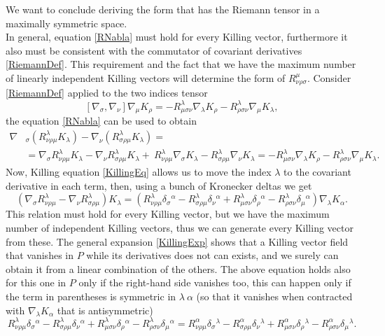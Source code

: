 We want to conclude deriving the form that has the Riemann tensor in a maximally symmetric space.\\
In general, equation \eqref{RNabla} must hold for every Killing vector, furthermore it also must be consistent with the commutator of covariant derivatives \eqref{RiemannDef}. This requirement and the fact that we have the maximum number of linearly independent Killing vectors will determine the form of $R^\mu_{\nu\rho\sigma}$. Consider \eqref{RiemannDef} applied to the two indices tensor $$ [\nabla_\sigma,\nabla_\nu]\nabla_\mu K_\rho=-R^\lambda_{\mu\sigma\nu}\nabla_\lambda K_\rho-R^\lambda _{\rho\sigma\nu}\nabla_\mu K_\lambda,$$ the equation \eqref{RNabla} can be used to obtain 
\begin{align*}
    \nabla&_\sigma(R^\lambda_{\nu\rho\mu}K_\lambda)-\nabla_\nu(R^\lambda_{\sigma\rho\mu}K_\lambda)=\\&=\nabla_\sigma R^\lambda_{\nu\rho\mu}K_\lambda-\nabla_\nu R^\lambda_{\sigma\rho\mu}K_\lambda+\ R^\lambda_{\nu\rho\mu}\nabla_\sigma K_\lambda- R^\lambda_{\sigma\rho\mu}\nabla_\nu K_\lambda=-R^\lambda_{\mu\sigma\nu}\nabla_\lambda K_\rho-R^\lambda _{\rho\sigma\nu}\nabla_\mu K_\lambda.
\end{align*}
Now, Killing equation \eqref{KillingEq} allows us to move the index $\lambda$ to the covariant derivative in each term, then, using a bunch of Kronecker deltas we get $$ (\nabla_\sigma R^\lambda_{\nu\rho\mu}-\nabla_\nu R^\lambda_{\sigma\rho\mu})K_\lambda=(R^\lambda_{\nu\rho\mu}\delta_{\sigma}\phantom{}^\alpha-R^\lambda_{\sigma\rho\mu}\delta_{\nu}\phantom{}^\alpha+R^\lambda_{\mu\sigma\nu}\delta_{\rho}\phantom{}^\alpha-R^\lambda_{\rho\sigma\nu}\delta_{\mu}\phantom{}^\alpha)\nabla_\lambda K_\alpha.$$
This relation must hold for every Killing vector, but we have the maximum number of independent Killing vectors, thus we can generate every Killing vector from these. The general expansion \eqref{KillingExp} shows that a Killing vector field that vanishes in $P$ while its derivatives does not can exists, and we surely can obtain it from a linear combination of the others. The above equation holds also for this one in $P$ only if the right-hand side vanishes too, this can happen only if the term in parentheses is symmetric in $\lambda\ \alpha$ (so that it vanishes when contracted with $\nabla_\lambda K_\alpha$ that is antisymmetric)$$R^\lambda_{\nu\rho\mu}\delta_{\sigma}\phantom{}^\alpha-R^\lambda_{\sigma\rho\mu}\delta_{\nu}\phantom{}^\alpha+R^\lambda_{\mu\sigma\nu}\delta_{\rho}\phantom{}^\alpha-R^\lambda_{\rho\sigma\nu}\delta_{\mu}\phantom{}^\alpha=R^\alpha_{\nu\rho\mu}\delta_{\sigma}\phantom{}^\lambda-R^\alpha_{\sigma\rho\mu}\delta_{\nu}\phantom{}^\lambda+R^\alpha_{\mu\sigma\nu}\delta_{\rho}\phantom{}^\lambda-R^\alpha_{\rho\sigma\nu}\delta_{\mu}\phantom{}^\lambda.$$
